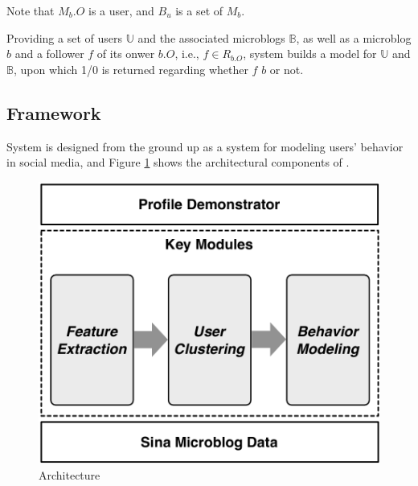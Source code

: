 Note that $M_b.O$ is a user, and $B_u$ is a set of $M_b$.


Providing a set of users $\mathbb{U}$ and the associated microblogs $\mathbb{B}$, as well as a microblog $b$ and a follower $f$ of its onwer $b.O$, i.e., $f \in R_{b.O}$, system \sys{} builds a \retg{} model for $\mathbb{U}$ and $\mathbb{B}$, upon which 1/0 is returned regarding whether $f$  $b$ or not.


\subsection{\sys{} Framework}
System \sys{} is designed from the ground up as a system for modeling users' \retg{} behavior in social media, and 
Figure \ref{fig:framework} shows the architectural components of \sys{}. %

\begin{figure}[tb!]
\centering
\includegraphics[width=.67\linewidth]{figures/architecture.pdf}
\vspace{-1ex}
\caption{\sys{} Architecture}
\label{fig:framework}
\vspace{-4ex}
\end{figure}

